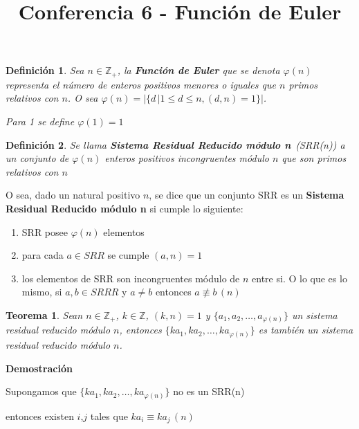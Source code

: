 \documentclass[a4paper,12pt]{report}
\title{Conferencia 6 - Función de Euler}
\author{}
\newtheorem*{teo}{Teorema}
\newtheorem*{dfn}{Definición}
\begin{document}
\maketitle


 
 \begin{dfn}
  Sea $n\in \mathbb{Z}_+$, la \textbf{Función de Euler} que se denota $\varphi(n)$ representa el número de enteros positivos menores o iguales que $n$ primos relativos con $n$. O sea $\varphi(n)=|\{d\, |1\leq d \leq n,(d,n)=1\}|$. 
  
  Para 1 se define $\varphi(1)=1$
 \end{dfn}
 
 \begin{dfn}
  Se llama \textbf{Sistema Residual Reducido módulo n}~(SRR(n)) a un conjunto de $\varphi(n)$ enteros positivos incongruentes módulo $n$ que son primos relativos con $n$
 \end{dfn}
 
 O sea, dado un natural positivo $n$, se dice que un conjunto SRR es un \textbf{Sistema Residual Reducido módulo n} si cumple lo siguiente:
 
 \begin{enumerate}
  \item SRR posee $\varphi(n)$ elementos
  \item para cada $a\in SRR$ se cumple $(a,n)=1$
  \item los elementos de SRR son incongruentes módulo de $n$ entre si. O lo que es lo mismo,  si $a,b\in SRRR$ y $a\neq b$ entonces $a\not\equiv b \, (n)$
 \end{enumerate}

 
\begin{teo}
 Sean $n\in\mathbb{Z}_+$, $k\in\mathbb{Z}$, $(k,n)=1$ y $\{a_1,a_2,\dots,a_{\varphi(n)}\}$ un sistema residual reducido módulo $n$, entonces $\{ka_1,ka_2,\dots,ka_{\varphi(n)}\}$ es también un sistema residual reducido módulo $n$.
\end{teo}

\textbf{Demostración}


Supongamos que $\{ka_1,ka_2,\dots,ka_{\varphi(n)}\}$ no es un SRR(n)

entonces existen $i$,$j$ tales que $ka_i\equiv ka_j \, (n)$
\end{document}
